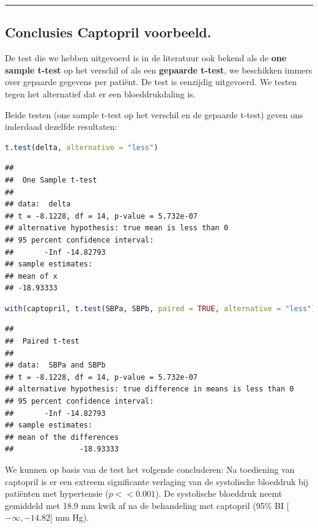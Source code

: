\documentclass[
  12pt,dutch,coursenotes]{book}
\theoremstyle{definition}
\theoremstyle{definition}
\theoremstyle{definition}
\theoremstyle{definition}
\theoremstyle{remark}
\begin{document}
\begin{center}\rule{0.5\linewidth}{0.5pt}\end{center}

\hypertarget{conclusies-captopril-voorbeeld.}{%
\subsection{Conclusies Captopril voorbeeld.}\label{conclusies-captopril-voorbeeld.}}

De test die we hebben uitgevoerd is in de literatuur ook bekend als de \textbf{one sample t-test} op het verschil of als een \textbf{gepaarde t-test}, we beschikken immers over gepaarde gegevens per patiënt.
De test is eenzijdig uitgevoerd. We testen tegen het alternatief dat er een bloeddrukdaling is.

Beide testen (one sample t-test op het verschil en de gepaarde t-test) geven ons inderdaad dezelfde resultaten:

\begin{lstlisting}[language=R]
t.test(delta, alternative = "less")
\end{lstlisting}

\begin{lstlisting}
## 
##  One Sample t-test
## 
## data:  delta
## t = -8.1228, df = 14, p-value = 5.732e-07
## alternative hypothesis: true mean is less than 0
## 95 percent confidence interval:
##       -Inf -14.82793
## sample estimates:
## mean of x 
## -18.93333
\end{lstlisting}

\begin{lstlisting}[language=R]
with(captopril, t.test(SBPa, SBPb, paired = TRUE, alternative = "less"))
\end{lstlisting}

\begin{lstlisting}
## 
##  Paired t-test
## 
## data:  SBPa and SBPb
## t = -8.1228, df = 14, p-value = 5.732e-07
## alternative hypothesis: true difference in means is less than 0
## 95 percent confidence interval:
##       -Inf -14.82793
## sample estimates:
## mean of the differences 
##               -18.93333
\end{lstlisting}

We kunnen op basis van de test het volgende concluderen:
Na toediening van captopril is er een extreem significante verlaging van de systolische bloeddruk bij patiënten met hypertensie
(\(p << 0.001\)). De systolische bloeddruk neemt gemiddeld met 18.9 mm kwik af na de behandeling met captopril (95\% BI {[}\(-\infty,-14.82\){]} mm Hg).
\end{document}
